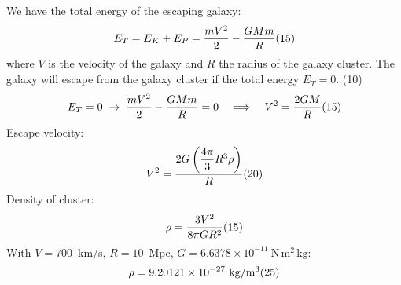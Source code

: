 We have the total energy of the escaping galaxy:
\[
E_T = E_K + E_P = \frac{mV^2}{2} - \frac{GMm}{R}
\hfill(15)
\]
where $V$ is the velocity of the galaxy and $R$ the radius of the galaxy
cluster. The galaxy will escape from the galaxy cluster if the total energy
$E_T = 0$. \hfill(10)
\[
E_T = 0 \;\rightarrow\; \frac{mV^2}{2} - \frac{GMm}{R} = 0
\quad\Longrightarrow\quad
V^2 = \frac{2GM}{R}
\hfill(15)
\]
Escape velocity:
\[
V^2 = \frac{2G\left(\dfrac{4\pi}{3}R^3\rho\right)}{R}
\hfill(20)
\]
Density of cluster:
\[
\rho = \frac{3V^2}{8\pi G R^2}
\hfill(15)
\]
With $V = 700$~km/s, $R = 10$~Mpc,
$G = 6.6378 \times 10^{-11}~\mathrm{N\,m^2\,kg}$:
\[
\rho = 9.20121 \times 10^{-27}~\mathrm{kg/m^3}
\hfill(25)
\]
